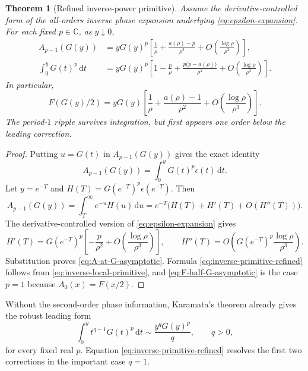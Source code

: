 \documentclass[11pt,oneside]{article}
\newtheorem{theorem}{Theorem}[section]
\theoremstyle{definition}
\theoremstyle{remark}
\newcommand{\C}{\mathbb C}
\newcommand{\dd}{\,\mathrm d}
\begin{document}
\begin{theorem}[Refined inverse-power primitive]\label{thm:inverse-primitive-asymptotic}
Assume the derivative-controlled form of the all-orders inverse phase expansion underlying \eqref{eq:epsilon-expansion}.  For each fixed $p\in\C$, as $y\downarrow0$,
\begin{align}
 A_{p-1}(G(y))
 &=yG(y)^p\left[
 \frac1\rho+\frac{a(\rho)-p}{\rho^2}
 +O\!\left(\frac{\log\rho}{\rho^3}\right)
 \right],\label{eq:A-at-G-asymptotic}\\
 \int_0^yG(t)^p\dd t
 &=yG(y)^p\left[
 1-\frac p\rho+\frac{p\bigl(p-a(\rho)\bigr)}{\rho^2}
 +O\!\left(\frac{\log\rho}{\rho^3}\right)
 \right].\label{eq:inverse-primitive-refined}
\end{align}
In particular,
\begin{equation}\label{eq:F-half-G-asymptotic}
 F(G(y)/2)=yG(y)\left[
 \frac1\rho+\frac{a(\rho)-1}{\rho^2}
 +O\!\left(\frac{\log\rho}{\rho^3}\right)
 \right].
\end{equation}
The period-$1$ ripple survives integration, but first appears one order below the leading correction.
\end{theorem}

\begin{proof}
Putting $u=G(t)$ in $A_{p-1}(G(y))$ gives the exact identity
\begin{equation}\label{eq:A-G-epsilon}
 A_{p-1}(G(y))=\int_0^yG(t)^p\epsilon(t)\dd t.
\end{equation}
Let $y=e^{-T}$ and $H(T)=G(e^{-T})^p\epsilon(e^{-T})$.  Then
\[
 A_{p-1}(G(y))=\int_T^\infty e^{-u}H(u)\dd u
 =e^{-T}\bigl(H(T)+H'(T)+O(H''(T))\bigr).
\]
The derivative-controlled version of \eqref{eq:epsilon-expansion} gives
\[
 H'(T)=G(e^{-T})^p\left[-\frac p{\rho^2}
 +O\!\left(\frac{\log\rho}{\rho^3}\right)\right],
 \qquad
 H''(T)=O\!\left(G(e^{-T})^p\frac{\log\rho}{\rho^3}\right).
\]
Substitution proves \eqref{eq:A-at-G-asymptotic}.  Formula \eqref{eq:inverse-primitive-refined} follows from \eqref{eq:inverse-local-primitive}, and \eqref{eq:F-half-G-asymptotic} is the case $p=1$ because $A_0(x)=F(x/2)$.
\end{proof}

Without the second-order phase information, Karamata's theorem already gives the robust leading form
\begin{equation}\label{eq:inverse-primitive-Karamata}
 \int_0^y t^{q-1}G(t)^p\dd t
 \sim\frac{y^qG(y)^p}{q},
 \qquad q>0,
\end{equation}
for every fixed real $p$.  Equation \eqref{eq:inverse-primitive-refined} resolves the first two corrections in the important case $q=1$.
\end{document}
